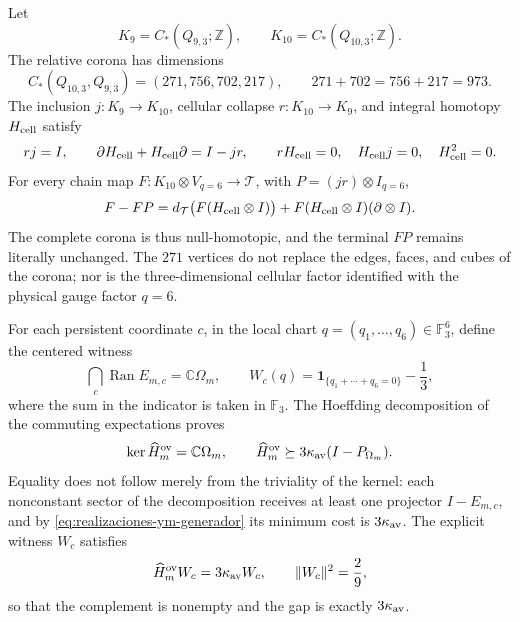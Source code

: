 Let
\[
 K_9=C_*(Q_{9,3};\mathbb Z),\qquad
 K_{10}=C_*(Q_{10,3};\mathbb Z).
\]
The relative corona has dimensions
\[
 C_*(Q_{10,3},Q_{9,3})=(271,756,702,217),
 \qquad 271+702=756+217=973.
\]
The inclusion \(j:K_9\to K_{10}\), cellular collapse
\(r:K_{10}\to K_9\), and integral homotopy \(H_{\rm cell}\) satisfy
\begin{equation}\label{eq:realizaciones-ym-sdr-corona}
 rj=I,\qquad
 \partial H_{\rm cell}+H_{\rm cell}\partial=I-jr,\qquad
 rH_{\rm cell}=0,\quad H_{\rm cell}j=0,\quad H_{\rm cell}^2=0.
\end{equation}
For every chain map
\(F:K_{10}\otimes V_{q=6}\to\mathcal T\), with
\(P=(jr)\otimes I_{q=6}\),
\begin{equation}\label{eq:realizaciones-ym-homotopia-terminal}
 F-FP
 =d_{\mathcal T}\bigl(F(H_{\rm cell}\otimes I)\bigr)
  +F(H_{\rm cell}\otimes I)(\partial\otimes I).
\end{equation}
The complete corona is thus null-homotopic, and the terminal \(FP\) remains
literally unchanged. The \(271\) vertices do not replace the edges, faces, and cubes
of the corona; nor is the three-dimensional cellular factor identified with the
physical gauge factor \(q=6\).

For each persistent coordinate \(c\), in the local chart
\(q=(q_1,\ldots,q_6)\in\mathbb F_3^6\), define the centered witness
\begin{equation}\label{eq:realizaciones-ym-testigo-definicion}
 \bigcap_c\operatorname{Ran}E_{m,c}=\mathbb C\Omega_m,
 \qquad
 W_c(q)=\mathbf 1_{\{q_1+\cdots+q_6=0\}}-\frac13,
\end{equation}
where the sum in the indicator is taken in \(\mathbb F_3\). The Hoeffding
decomposition of the commuting expectations proves
\begin{equation}\label{eq:realizaciones-ym-gap-finito}
 \ker\widehat H_m^{\rm ov}=\mathbb C\Omega_m,
 \qquad
 \widehat H_m^{\rm ov}\succeq
 3\kappa_{\rm av}(I-P_{\Omega_m}).
\end{equation}
Equality does not follow merely from the triviality of the kernel: each nonconstant
sector of the decomposition receives at least one projector
\(I-E_{m,c}\), and by \eqref{eq:realizaciones-ym-generador} its minimum cost
is \(3\kappa_{\rm av}\). The explicit witness \(W_c\) satisfies
\begin{equation}\label{eq:realizaciones-ym-testigo-gap}
 \widehat H_m^{\rm ov}W_c=3\kappa_{\rm av}W_c,
 \qquad \|W_c\|^2=\frac29,
\end{equation}
so that the complement is nonempty and the gap is exactly
\(3\kappa_{\rm av}\).

